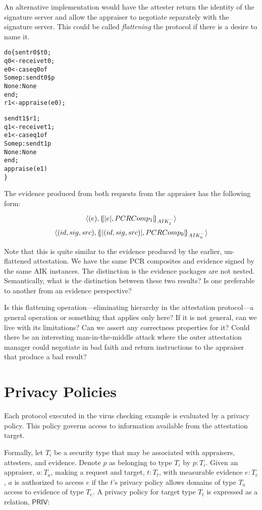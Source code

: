 \documentclass[10pt]{article}
\begin{document}
An alternative implementation would have the attester
return the identity of the signature server and allow the appraiser to
negotiate separately with the signature server.  This could be called
\emph{flattening} the protocol if there is a desire to name it.

\begin{alltt}
  do \{ sent r0 \$ t0;
       q0 <- receive t0;
       e0 <- case q0 of
               Some p : send t0 \$ p
               None : None
             end;
       r1 <- appraise(e0);
       
       send t1 \$ r1;
       q1 <- receive t1;
       e1 <- case q1 of
               Some p : send t1 p
               None : None
             end;
       appraise(e1)
  \}
\end{alltt}

The evidence produced from both requests from the appraiser has the
following form:

\[\langle (e),\{\!\lvert \lvert e \rvert,PCRComp_1\rvert\!\}_{AIK_1^{-}}\rangle\]
\[\langle (id,sig,src),\{\!\lvert \lvert (id,sig,src) \rvert,PCRComp_0\rvert\!\}_{AIK_0^{-}}\rangle\]

Note that this is quite similar to the evidence produced by the
earlier, un-flattened attestation.  We have the same PCR composites
and evidence signed by the same AIK instances.  The distinction is the
evidence packages are not nested.  Semantically, what is the
distinction between these two results?  Is one preferable to another
from an evidence perspective?

Is this flattening operation---eliminating hierarchy in the
attestation protocol---a general operation or something that applies
only here?  If it is not general, can we live with its limitations?
Can we assert any correctness properties for it?  Could there be an
interesting man-in-the-middle attack where the outer attestation
manager could negotiate in bad faith and return instructions to the
appraiser that produce a bad result?

\section*{Privacy Policies}

Each protocol executed in the virus checking example is evaluated by a
privacy policy.  This policy governs access to information available
from the attestation target.  

Formally, let $T_i$ be a security type that may be associated with
appraisers, attesters, and evidence.  Denote $p$ as
belonging to type $T_i$ by $p:T_i$.  Given an appraiser, $a:T_a$,
making a request and target, $t:T_t$, with measurable evidence
$e:T_e$, $a$ is authorized to access $e$ if the $t$'s privacy policy
allows domains of type $T_a$ access to evidence of type $T_e$. A
privacy policy for target type $T_t$ is expressed as a relation,
$\mathsf{PRIV}$:
\end{document}
